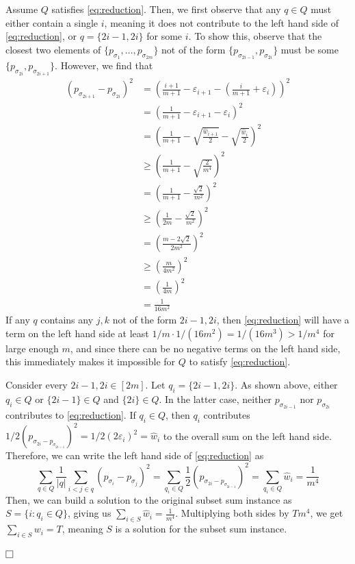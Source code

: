 \documentclass[11pt]{article}
\def\squarebox#1{\hbox to #1{\hfill\vbox to #1{\vfill}}}
\newcommand{\qed}{\hspace*{\fill}\vbox{\hrule\hbox{\vrule\squarebox{.667em}\vrule}\hrule}\smallskip}
\newenvironment{proof}{\noindent{\bf Proof:~~}}{\(\qed\)}
\newcommand{\p}[1]{\left(#1\right)}
\begin{document}
\begin{proof}
  Assume $Q$ satisfies \eqref{eq:reduction}. Then, we first observe that any $q
  \in Q$ must either contain a single $i$, meaning it does not contribute to the
  left hand side of \eqref{eq:reduction}, or $q = \{2i-1, 2i\}$ for some $i$. To
  show this, observe that the closest two elements of $\{p_{\sigma_1}, \dots,
  p_{\sigma_{2m}}\}$ not of the form $\{p_{\sigma_{2i-1}}, p_{\sigma_{2i}}\}$ must
  be some $\{p_{\sigma_{2i}}, p_{\sigma_{2i+1}}\}$. However, we find that
  \begin{align*}
    (p_{\sigma_{2i+1}} - p_{\sigma_{2i}})^2 &= \p{\frac{i+1}{m+1} -
    \varepsilon_{i+1} - \p{\frac{i}{m+1} + \varepsilon_i}}^2 \\
    &= \p{\frac{1}{m+1} - \varepsilon_{i+1} - \varepsilon_i}^2 \\
    &= \p{\frac{1}{m+1} - \sqrt{\frac{\hat w_{i+1}}{2}} - \sqrt{\frac{\hat
    w_i}{2}}}^2 \\
    &\ge \p{\frac{1}{m+1} - \sqrt{\frac{2}{m^4}} \tag{$\hat w_i \le 1/m^4$}}^2
    \\
    &= \p{\frac{1}{m+1} - \frac{\sqrt{2}}{m^2}}^2 \\
    &\ge \p{\frac{1}{2m} - \frac{\sqrt{2}}{m^2}}^2 \\
    &= \p{\frac{m - 2\sqrt{2}}{2m^2}}^2 \\
    &\ge \p{\frac{m}{4m^2}}^2 \\
    &= \p{\frac{1}{4m}}^2 \\
    &= \frac{1}{16 m^2}
  \end{align*}
  If any $q$ contains any $j,k$ not of the form $2i-1, 2i$, then
  \eqref{eq:reduction} will have a term on the left hand side at least $1/m
  \cdot 1/(16m^2) = 1/(16m^3) > 1/m^4$ for large enough $m$, and since there can
  be no negative terms on the left hand side, this immediately makes it
  impossible for $Q$ to satisfy \eqref{eq:reduction}.

  Consider every $2i-1, 2i \in [2m]$. Let $q_i = \{2i-1, 2i\}$. As shown above,
  either $q_i \in Q$ or $\{2i-1\} \in Q$ and $\{2i\} \in Q$. In the latter case,
  neither $p_{\sigma_{2i-1}}$ nor $p_{\sigma_{2i}}$ contributes to
  \eqref{eq:reduction}. If $q_i \in Q$, then $q_i$ contributes
  $1/2(p_{\sigma_{2i} - p_{\sigma_{2i-1}}})^2 = 1/2 (2\varepsilon_i)^2 = \hat
  w_i$ to the overall sum on the left hand side. Therefore, we can write the
  left hand side of \eqref{eq:reduction} as
  \begin{equation*}
    \sum_{q \in Q} \frac{1}{|q|} \sum_{i < j \in q} (p_{\sigma_i} -
    p_{\sigma_j})^2 = \sum_{q_i \in Q} \frac{1}{2} (p_{\sigma_{2i} -
    p_{\sigma_{2i-1}}})^2 =  \sum_{q_i \in Q} \hat w_i = \frac{1}{m^4}
  \end{equation*}
  Then, we can build a solution to the original subset sum instance as $S = \{i
  : q_i \in Q\}$, giving us $\sum_{i \in S} \hat w_i = \frac{1}{m^4}$.
  Multiplying both sides by $T m^4$, we get $\sum_{i \in S} w_i = T$, meaning
  $S$ is a solution for the subset sum instance.


\end{proof}
\end{document}
